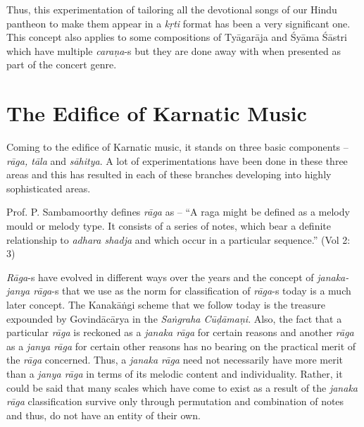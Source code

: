 Thus, this experimentation of tailoring all the devotional songs of our Hindu pantheon to make them appear in a \textit{kṛti} format has been a very significant one. This concept also applies to some compositions of Tyāgarāja and Śyāma Śāstri which have multiple \textit{caraṇa}-s but they are done away with when presented as part of the concert genre.

\vspace{-.3cm}

\section*{The Edifice of Karnatic Music}

Coming to the edifice of Karnatic music, it stands on three basic components – \textit{rāga, tāla} and \textit{sāhitya}. A lot of experimentations have been done in these three areas and this has resulted in each of these branches developing into highly sophisticated areas.

Prof. P. Sambamoorthy defines \textit{rāga} as – “A raga might be defined as a melody mould or melody type. It consists of a series of notes, which bear a definite relationship to \textit{adhara shadja} and which occur in a particular sequence.” (Vol 2: 3)

\textit{Rāga}-s have evolved in different ways over the years and the concept of \textit{janaka-janya rāga}-s that we use as the norm for classification of \textit{rāga}-s today is a much later concept. The Kanakāṅgi scheme that we follow today is the treasure expounded by Govindācārya in the \textit{Saṅgraha Cūḍāmaṇi}. Also, the fact that a particular \textit{rāga} is reckoned as a \textit{janaka rāga} for certain reasons and another \textit{rāga} as a \textit{janya rāga} for certain other reasons has no bearing on the practical merit of the \textit{rāga} concerned. Thus, a \textit{janaka rāga} need not necessarily have more merit than a \textit{janya rāga} in terms of its melodic content and individuality. Rather, it could be said that many scales which have come to exist as a result of the \textit{janaka rāga} classification survive only through permutation and combination of notes and thus, do not have an entity of their own.


